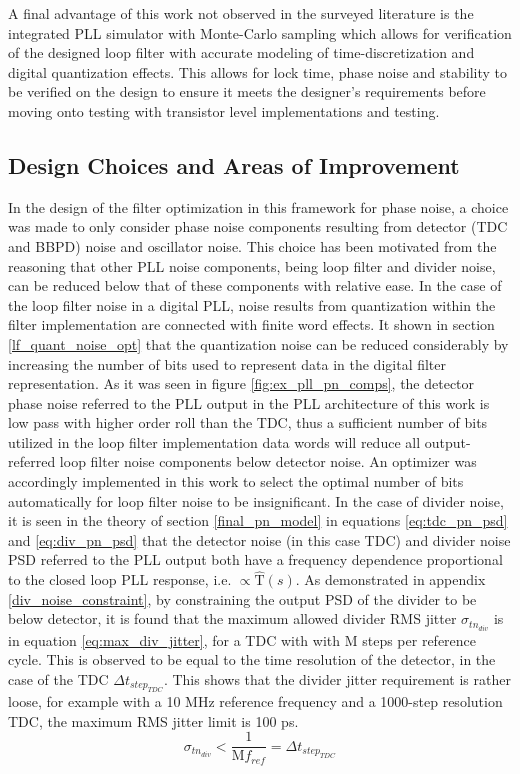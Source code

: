 A final advantage of this work not observed in the surveyed literature is the integrated PLL simulator with Monte-Carlo sampling which allows for verification of the designed loop filter with accurate modeling of time-discretization and digital quantization effects. This allows for lock time, phase noise and stability to be verified on the design to ensure it meets the designer's requirements before moving onto testing with transistor level implementations and testing.

\subsection{Design Choices and Areas of Improvement}
In the design of the filter optimization in this framework for phase noise, a choice was made to only consider phase noise components resulting from detector (TDC and BBPD) noise and oscillator noise. This choice has been motivated from the reasoning that other PLL noise components, being loop filter and divider noise, can be reduced below that of these components with relative ease. In the case of the loop filter noise in a digital PLL, noise results from quantization within the filter implementation are connected with finite word effects. It shown in section \ref{lf_quant_noise_opt} that the quantization noise can be reduced considerably by increasing the number of bits used to represent data in the digital filter representation. As it was seen in figure \ref{fig:ex_pll_pn_comps}, the detector phase noise referred to the PLL output in the PLL architecture of this work is low pass with higher order roll than the TDC, thus a sufficient number of bits utilized in the loop filter implementation data words will reduce all output-referred loop filter noise components below detector noise. An optimizer was accordingly implemented in this work to select the optimal number of bits automatically for loop filter noise to be insignificant. In the case of divider noise, it is seen in the theory of section \ref{final_pn_model} in equations \ref{eq:tdc_pn_psd} and \ref{eq:div_pn_psd} that the detector noise (in this case TDC) and divider noise PSD referred to the PLL output both have a frequency dependence proportional to the closed loop PLL response, i.e. $\propto\hat{\mathrm{T}}(s)$. As demonstrated in appendix \ref{div_noise_constraint}, by constraining the output PSD of the divider to be below detector, it is found that the maximum allowed divider RMS jitter $\sigma_{tn_{div}}$ is in equation \ref{eq:max_div_jitter}, for a TDC with with M steps per reference cycle. This is observed to be equal to the time resolution of the detector, in the case of the TDC $\Delta t_{step_{TDC}}$. This shows that the divider jitter requirement is rather loose, for example with a 10 MHz reference frequency and a 1000-step resolution TDC, the maximum RMS jitter limit is 100 ps. 
\begin{equation}\label{eq:max_div_jitter}
		\sigma_{tn_{div}} < \frac{1}{\mathrm{M}f_{ref}} = \Delta t_{step_{TDC}}
\end{equation}

